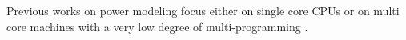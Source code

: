
Previous works on power modeling focus either on single core CPUs
\cite{kellner03tempcontrol} or on multi core machines with a very low degree of
multi-programming \cite{Bertran2010,bertran2010decomposable}.
